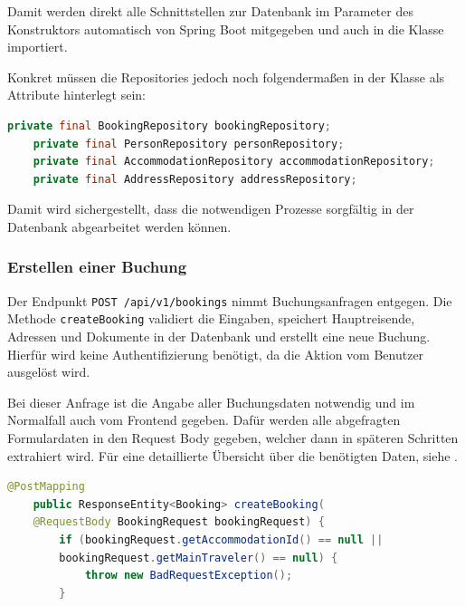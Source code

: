 Damit werden direkt alle Schnittstellen zur Datenbank im Parameter des Konstruktors automatisch von Spring Boot mitgegeben und auch in die Klasse importiert.

Konkret müssen die Repositories jedoch noch folgendermaßen in der Klasse als Attribute hinterlegt sein:

\begin{lstlisting}[caption={Deklarierung der Repositories als finale (= nicht modifizierbare) Attribute.}, label={code-bookings-repositories}, language=Java]
	private final BookingRepository bookingRepository;
	private final PersonRepository personRepository;
	private final AccommodationRepository accommodationRepository;
	private final AddressRepository addressRepository;
\end{lstlisting}

Damit wird sichergestellt, dass die notwendigen Prozesse sorgfältig in der Datenbank abgearbeitet werden können.

\subsubsection{Erstellen einer Buchung}

Der Endpunkt \texttt{POST /api/v1/bookings} nimmt Buchungsanfragen entgegen. Die Methode \texttt{createBooking} validiert die Eingaben, speichert Hauptreisende, Adressen und Dokumente in der Datenbank und erstellt eine neue Buchung. Hierfür wird keine Authentifizierung benötigt, da die Aktion vom Benutzer ausgelöst wird. 

Bei dieser Anfrage ist die Angabe aller Buchungsdaten notwendig und im Normalfall auch vom Frontend gegeben. Dafür werden alle abgefragten Formulardaten in den Request Body gegeben, welcher dann in späteren Schritten extrahiert wird. Für eine detaillierte Übersicht über die benötigten Daten, siehe \cite{website-github-backend-example-booking-post}.

\newpage

\begin{lstlisting}[caption={Code-Ausschnitt des Buchungs-Controllers: Validierung der Eingaben bei der Erstellung einer neuen Buchung.}, label={code-bookings-userinput-body-validation}, language=Java]
	@PostMapping
	public ResponseEntity<Booking> createBooking(
	@RequestBody BookingRequest bookingRequest) {
		if (bookingRequest.getAccommodationId() == null || 
		bookingRequest.getMainTraveler() == null) {
			throw new BadRequestException();
		}
	\end{lstlisting}
	
